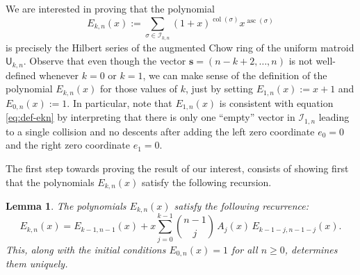 \documentclass[11pt, a4paper, english]{amsart}
\theoremstyle{teoremas}
\newtheorem{lemma}[theorem]{Lemma}
\theoremstyle{definition}
\newcommand{\U}{\mathsf{U}}
\newcommand{\col}{\operatorname{col}}
\newcommand{\asc}{\operatorname{asc}}
\begin{document}
We are interested in proving that the polynomial
    \begin{equation}\label{eq:def-ekn} 
    E_{k,n}(x) := \sum_{\sigma\in \mathcal{I}_{k,n}} (1+x)^{\col(\sigma)}x^{\asc(\sigma)}
    \end{equation} 
is precisely the Hilbert series of the augmented Chow ring of the uniform matroid $\U_{k,n}$. Observe that even though the vector $\mathbf{s}=(n-k+2,\ldots,n)$ is not well-defined whenever $k=0$ or $k=1$, we can make sense of the definition of the polynomial $E_{k,n}(x)$ for those values of $k$, just by setting $E_{1,n}(x):=x+1$ and $E_{0,n}(x):=1$. In particular, note that $E_{1,n}(x)$ is consistent with equation \eqref{eq:def-ekn} by interpreting that there is only one ``empty'' vector in $\mathcal{I}_{1,n}$ leading to a single collision and no descents after adding the left zero coordinate $e_0=0$ and the right zero coordinate $e_1=0$.

The first step towards proving the result of our interest, consists of showing first that the polynomials $E_{k,n}(x)$ satisfy the following recursion.


\begin{lemma}\label{lemma:recurrence-hz}
    The polynomials $E_{k,n}(x)$ satisfy the following recurrence:
    \[ E_{k,n}(x) = E_{k-1,n-1}(x) + x \sum_{j=0}^{k-1} \binom{n-1}{j}\,  A_{j}(x)\, E_{k-1-j,n-1-j}(x).\]
    This, along with the initial conditions $E_{0,n}(x) = 1$ for all $n\geq 0$, determines them uniquely.
\end{lemma}
\end{document}
